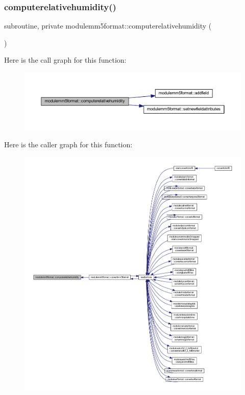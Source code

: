 \subsubsection{\texorpdfstring{computerelativehumidity()}{computerelativehumidity()}}
{\footnotesize\ttfamily subroutine, private modulemm5format\+::computerelativehumidity (\begin{DoxyParamCaption}{ }\end{DoxyParamCaption})\hspace{0.3cm}{\ttfamily [private]}}

Here is the call graph for this function\+:\nopagebreak
\begin{figure}[H]
\begin{center}
\leavevmode
\includegraphics[width=350pt]{namespacemodulemm5format_a3dffbb656aa84f1197105f493790f428_cgraph}
\end{center}
\end{figure}
Here is the caller graph for this function\+:\nopagebreak
\begin{figure}[H]
\begin{center}
\leavevmode
\includegraphics[width=350pt]{namespacemodulemm5format_a3dffbb656aa84f1197105f493790f428_icgraph}
\end{center}
\end{figure}
\mbox{\label{namespacemodulemm5format_a6beb646cd455e39599d5f9f360390986}} 
